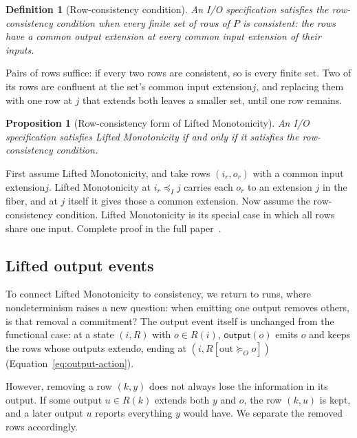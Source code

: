 \documentclass[sigconf]{cidr-2027}
\makeatletter
\newtheorem{proposition}{Proposition}
\newtheorem{definition}{Definition}
\theoremstyle{remark}
\newcommand{\InputOrd}{\preceq_I}
\newcommand{\OutputGe}{\succeq_O}
\newcommand{\commitment}{commitment\xspace}
\newcommand{\indesc}{input extension\xspace} %
\newcommand{\outrel}{extends\xspace}          %
\newcommand{\outrelbase}{extend\xspace}       %
\newcommand{\outnoun}{output extension\xspace}%
\newcommand{\spectype}[1][]{I/O specification#1\xspace}
\newcommand{\fullproof}{Complete proof in the full paper~\cite{hellerstein2026completecalmfull}.}
\renewenvironment{proof}[1][\proofname]{\par
  \pushQED{\qed}\normalfont\topsep2\p@\relax
  \trivlist\item[\@proofindent\hskip\labelsep{\@proofnamefont #1\@addpunct{.}}]\ignorespaces
}{\popQED\endtrivlist\@endpefalse}
\makeatother
\begin{document}
\begin{definition}[Row-consistency condition]
\label{def:common-expansion-condition}
An \spectype satisfies the \emph{row-consistency condition} when every finite set of rows of $P$ is consistent: the rows have a common \outnoun at every common \indesc of their inputs.
\end{definition}

Pairs of rows suffice: if every two rows are consistent, so is every finite
set.  Two of its rows are confluent at the set's common \indesc $j$, and
replacing them with one row at $j$ that \outrel both leaves a smaller set,
until one row remains.

\begin{proposition}[Row-consistency form of Lifted Monotonicity]
\label{prop:common-expansion-form}
An \spectype satisfies Lifted Monotonicity if and only
if it satisfies the row-consistency condition.
\end{proposition}

\begin{proof}[Proof sketch]
First assume Lifted Monotonicity, and take rows $(i_r,o_r)$ with a common
\indesc $j$.  Lifted Monotonicity at $i_r\InputOrd j$ carries
each $o_r$ to an extension $j$ in the fiber, and at $j$ itself it gives those
a common extension.  Now assume the row-consistency condition.  Lifted
Monotonicity is its special case in which all rows share one input.
\fullproof
\end{proof}

\subsection{Lifted output events}
\label{sec:lifted-output-events}

To connect Lifted Monotonicity to consistency, we return to
runs, where nondeterminism raises a new question: when emitting one output
removes others, is that removal a \commitment?  The output event itself is unchanged from the functional case: at a state $(i,R)$ with $o\in R(i)$,
$\mathsf{output}(o)$ emits $o$ and keeps the rows whose outputs \outrelbase $o$,
ending at $(i,R[\mathrm{out}\OutputGe o])$ (Equation~\ref{eq:output-action}).

However, removing a row $(k,y)$ does not always lose the information in its output.  If
some output $u\in R(k)$ \outrel both $y$ and $o$, the row $(k,u)$ is kept, and
a later output $u$ reports everything $y$ would have.  We separate the removed
rows accordingly.
\end{document}
